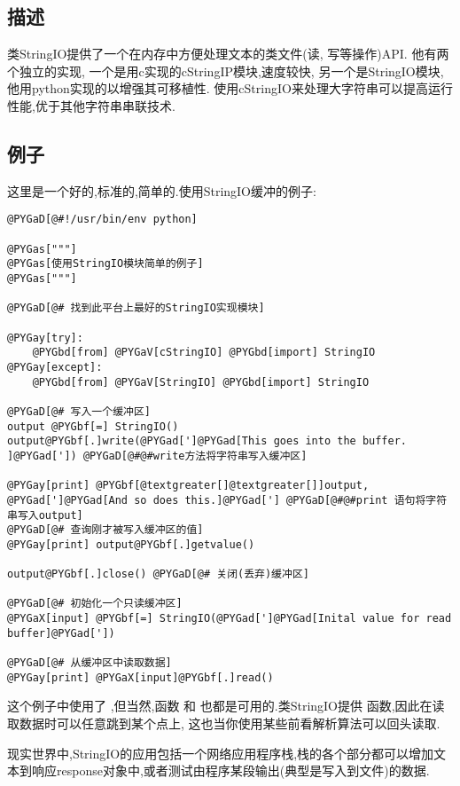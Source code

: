 \documentclass[letterpaper,10pt,english]{manual}
\begin{document}
\subsection{描述}

类StringIO提供了一个在内存中方便处理文本的类文件(读, 写等操作)API. 他有两个独立的实现, 一个是用c实现的cStringIP模块,速度较快, 另一个是StringIO模块,他用python实现的以增强其可移植性. 使用cStringIO来处理大字符串可以提高运行性能,优于其他字符串串联技术.


\subsection{例子}

这里是一个好的,标准的,简单的.使用StringIO缓冲的例子:

\begin{Verbatim}[commandchars=@\[\]]
@PYGaD[@#!/usr/bin/env python]

@PYGas["""]
@PYGas[使用StringIO模块简单的例子]
@PYGas["""]

@PYGaD[@# 找到此平台上最好的StringIO实现模块]

@PYGay[try]:
    @PYGbd[from] @PYGaV[cStringIO] @PYGbd[import] StringIO
@PYGay[except]:
    @PYGbd[from] @PYGaV[StringIO] @PYGbd[import] StringIO

@PYGaD[@# 写入一个缓冲区]
output @PYGbf[=] StringIO()
output@PYGbf[.]write(@PYGad[']@PYGad[This goes into the buffer. ]@PYGad[']) @PYGaD[@#@#write方法将字符串写入缓冲区]

@PYGay[print] @PYGbf[@textgreater[]@textgreater[]]output, @PYGad[']@PYGad[And so does this.]@PYGad['] @PYGaD[@#@#print 语句将字符串写入output]
@PYGaD[@# 查询刚才被写入缓冲区的值]
@PYGay[print] output@PYGbf[.]getvalue()

output@PYGbf[.]close() @PYGaD[@# 关闭(丢弃)缓冲区]

@PYGaD[@# 初始化一个只读缓冲区]
@PYGaX[input] @PYGbf[=] StringIO(@PYGad[']@PYGad[Inital value for read buffer]@PYGad['])

@PYGaD[@# 从缓冲区中读取数据]
@PYGay[print] @PYGaX[input]@PYGbf[.]read()
\end{Verbatim}

这个例子中使用了  ,但当然,函数  和  也都是可用的.类StringIO提供  函数,因此在读取数据时可以任意跳到某个点上, 这也当你使用某些前看解析算法可以回头读取.

现实世界中,StringIO的应用包括一个网络应用程序栈,栈的各个部分都可以增加文本到响应response对象中,或者测试由程序某段输出(典型是写入到文件)的数据.
\end{document}
